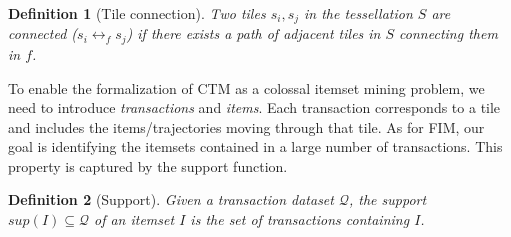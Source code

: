 \documentclass[
]{ceurart}
\newtheorem{example}{Example}
\newtheorem{definition}{Definition}
\begin{document}
\begin{definition}[Tile connection]\label{def:adj} 
Two tiles $s_i,s_j$ in the tessellation $S$ are  \textit{connected} ($s_i \leftrightarrow_{f} s_j$) if there exists a path of adjacent tiles in $S$ connecting them in $f$.
\end{definition}


To enable the formalization of CTM as a colossal itemset mining problem, we need to introduce \textit{transactions} and \textit{items}.
Each transaction corresponds to a tile and includes the items/trajectories moving through that tile.
%
%
%
As for FIM, our goal is identifying the itemsets contained in a large number of transactions.
This property is captured by the support function.

\begin{definition}[Support]
Given a transaction dataset $\mathcal{Q}$, the \textit{support} $sup(I)\subseteq\mathcal{Q}$ of an itemset $I$ is the set of transactions containing $I$.
\end{definition}
\end{document}
